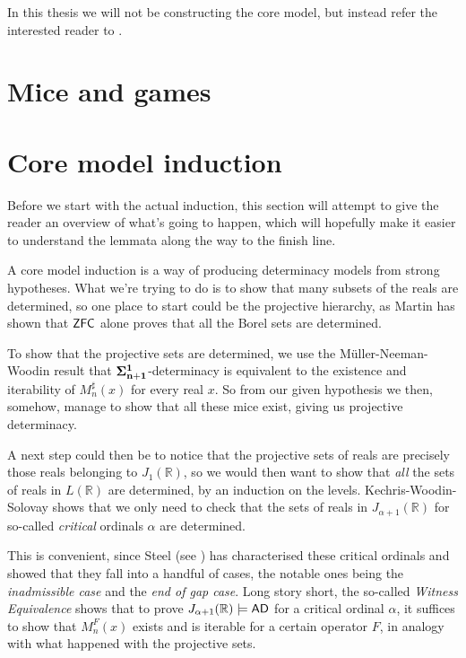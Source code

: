 \documentclass[../../main]{subfiles}
\begin{document}
\qquad In this thesis we will not be constructing the core model, but instead refer the interested reader to .


\section{Mice and games}



\section{Core model induction}

Before we start with the actual induction, this section will attempt to give the reader an overview of what's going to happen, which will hopefully make it easier to understand the lemmata along the way to the finish line.

\qquad A core model induction is a way of producing determinacy models from strong hypotheses. What we're trying to do is to show that many subsets of the reals are determined, so one place to start could be the projective hierarchy, as Martin has shown that $\textsf{ZFC}$ alone proves that all the Borel sets are determined.

\qquad To show that the projective sets are determined, we use the M\" uller-Neeman-Woodin result that $\bf\Sigma^1_{n+1}$-determinacy is equivalent to the existence and iterability of $M_n^\sharp(x)$ for every real $x$. So from our given hypothesis we then, somehow, manage to show that all these mice exist, giving us projective determinacy.

\qquad A next step could then be to notice that the projective sets of reals are precisely those reals belonging to $J_1(\mathbb R)$, so we would then want to show that \textit{all} the sets of reals in $L(\mathbb R)$ are determined, by an induction on the levels. Kechris-Woodin-Solovay  shows that we only need to check that the sets of reals in $J_{\alpha+1}(\mathbb R)$ for so-called \textit{critical} ordinals $\alpha$ are determined.

\qquad This is convenient, since Steel (see \cite{scalesinL(R)}) has characterised these critical ordinals and showed that they fall into a handful of cases, the notable ones being the \textit{inadmissible case} and the \textit{end of gap case}. Long story short, the so-called \textit{Witness Equivalence} shows that to prove $J_{\alpha+1}(\mathbb R)\models\textsf{AD}$ for a critical ordinal $\alpha$, it suffices to show that $M_n^F(x)$ exists and is iterable for a certain operator $F$, in analogy with what happened with the projective sets.
\end{document}
